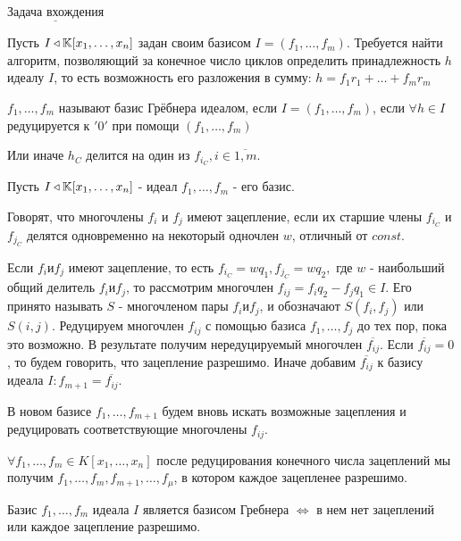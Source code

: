 $\underline{\text{Задача вхождения}}$ 

Пусть $I \triangleleft \mathbb{K}[x_1,\ldots,x_n]$ задан своим базисом $I = (f_1,\ldots,f_m)$. Требуется найти алгоритм, позволяющий за конечное число циклов определить принадлежность $h$ идеалу $I$, то есть возможность его разложения в сумму: $h = f_1r_1 + \ldots + f_mr_m$

\opr $f_1,\ldots,f_m$ называют базис Грёбнера идеалом, если $I = (f_1,\ldots,f_m)$, если $\forall h \in I$ редуцируется к $'0'$ при помощи $(f_1,\dots,f_m)$

Или иначе $h_C$ делится на один из $f_{i_C},i \in \overline{1,m}$.

Пусть $I \triangleleft \mathbb{K}[x_1,\ldots,x_n]$ - идеал $f_1,\ldots,f_m $ - его базис.

\opr Говорят, что многочлены $f_i$ и $f_j$ имеют зацепление, если их старшие члены $f_{i_C}$ и $f_{j_C}$ делятся одновременно на некоторый одночлен $w$, отличный от $const$.

Если $f_i и f_j$ имеют зацепление, то есть $f_{i_C} = wq_1, f_{j_C} = wq_2,$ где $w$ - наибольший общий делитель $f_i и f_j$, то рассмотрим многочлен $f_{ij} = f_iq_2 - f_jq_1 \in I$. Его принято называть $S$ - многочленом пары $f_i и f_j$, и обозначают $S(f_i,f_j)$ или $S(i,j)$. Редуцируем многочлен $f_{ij}$ с помощью базиса $f_1,\ldots,f_j$ до тех пор, пока это возможно. В результате получим нередуцируемый многочлен $\overline{f_{ij}}$. Если $\overline{f_{ij}} = 0$, то будем говорить, что зацепление разрешимо. Иначе добавим $\overline{f_{ij}}$ к базису идеала $I: f_{m+1} = \overline{f_{ij}}$.

В новом базисе $f_1,\ldots,f_{m+1}$ будем вновь искать возможные зацепления и редуцировать соответствующие многочлены $f_{ij}$.

\thr $\forall f_1,\ldots,f_m \in K[x_1,\ldots,x_n]$ после редуцирования конечного числа зацеплений мы получим $f_1,\ldots,f_m,f_{m+1},\ldots,f_\mu$, в котором каждое зацепленее разрешимо.

\thr Базис $f_1,\ldots,f_m$ идеала $I$ является базисом Гребнера $\Leftrightarrow$ в нем нет зацеплений или каждое зацепление разрешимо.

